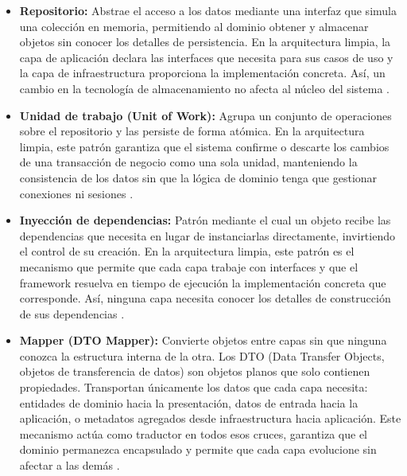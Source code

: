 \begin{itemize}
    \item \textbf{Repositorio:} Abstrae el acceso a los datos mediante una interfaz que simula una colección en memoria, permitiendo al dominio obtener y almacenar objetos sin conocer los detalles de persistencia. En la arquitectura limpia, la capa de aplicación declara las interfaces que necesita para sus casos de uso y la capa de infraestructura proporciona la implementación concreta. Así, un cambio en la tecnología de almacenamiento no afecta al núcleo del sistema \cite{evans2003, fowler2002}.
    
    \item \textbf{Unidad de trabajo (Unit of Work):} Agrupa un conjunto de operaciones sobre el repositorio y las persiste de forma atómica. En la arquitectura limpia, este patrón garantiza que el sistema confirme o descarte los cambios de una transacción de negocio como una sola unidad, manteniendo la consistencia de los datos sin que la lógica de dominio tenga que gestionar conexiones ni sesiones \cite{fowler2002}.

    \item \textbf{Inyección de dependencias:} Patrón mediante el cual un objeto recibe las dependencias que necesita en lugar de instanciarlas directamente, invirtiendo el control de su creación. 
    En la arquitectura limpia, este patrón es el mecanismo que permite que cada capa trabaje con interfaces y que el framework resuelva en tiempo de ejecución la implementación concreta que corresponde. 
    Así, ninguna capa necesita conocer los detalles de construcción de sus dependencias \cite{fowler2004}.
    

\item \textbf{Mapper (DTO Mapper):} Convierte objetos entre capas sin que ninguna conozca la estructura interna de la otra. 
Los DTO (Data Transfer Objects, objetos de transferencia de datos) son objetos planos que solo contienen propiedades.
Transportan únicamente los datos que cada capa necesita: entidades de dominio hacia la presentación, datos de entrada hacia la aplicación, o metadatos agregados desde infraestructura hacia aplicación. 
Este mecanismo actúa como traductor en todos esos cruces, garantiza que el dominio permanezca encapsulado y permite que cada capa evolucione sin afectar a las demás \cite{fowler2002}.

 
\end{itemize}

